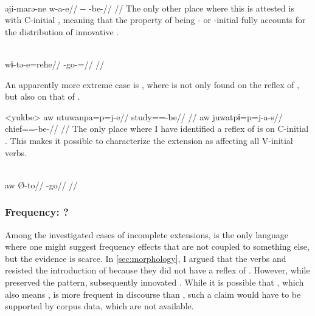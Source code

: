 \carijo \parencite[][42]{guerrero2016karihona}\\
\begingl
\gla əji-marə-ne w-a-e//
\glb {}-- -be-//
\glft {}//
\endgl
\xe
%
The only other place where this  is attested is with C-initial   , meaning that the property of being - or -initial fully accounts for the distribution of innovative .

\carijo \parencite[][5]{guerrero2016karihona}\\
\begingl
\gla wɨ-tə-e=rehe//
\glb {}-go-=//
\glft {}//
\endgl
\xe

An apparently more extreme case is \yukpa, where  is not only found on the reflex of  , but also on that of  .

\pex<yukbe>\yukpa \parencite[][142, 143]{meira2006syntactic}
\begingl
\gla aw utuwanpa=p=j-e//
\glb {} study==-be//
\glft {}//
\endgl
{}
\begingl
\gla aw juwatpɨ=p=j-a-s//
\glb {} chief==-be-//
\glft {}//
\endgl
\xe
%
The only place where I have identified a reflex of  is on C-initial  .
This makes it possible to characterize the extension as affecting all V-initial verbs.

\yukpa \parencite[][139]{meira2006syntactic}\\
\begingl
\gla aw Ø-to//
\glb {} -go//
\glft {}//
\endgl
\xe


\subsubsection{Frequency: \bakairi?}
\label{sec:frequency}
Among the investigated cases of incomplete extensions, \bakairi is the only language where one might suggest frequency effects that are not coupled to something else, but the evidence is scarce.
In \cref{sec:morphology}, I argued that the \PPek verbs   and   resisted the introduction of  because they did not have a reflex of \detrz.
However, while \bakairi {}  preserved the \PPek pattern,   subsequently innovated .
While it is possible that , which also means  \parencite[105]{von1892bakairi}, is more frequent in \bakairi discourse than , such a claim would have to be supported by corpus data, which are not available.

